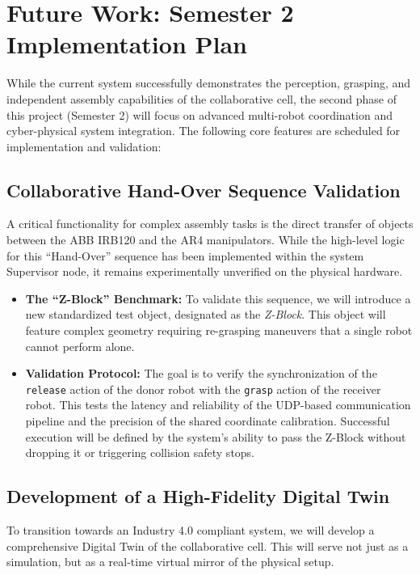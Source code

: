 \section{Future Work: Semester 2 Implementation Plan}

While the current system successfully demonstrates the perception, grasping, and independent assembly capabilities of the collaborative cell, the second phase of this project (Semester 2) will focus on advanced multi-robot coordination and cyber-physical system integration. The following core features are scheduled for implementation and validation:

\subsection{Collaborative Hand-Over Sequence Validation}
A critical functionality for complex assembly tasks is the direct transfer of objects between the ABB IRB120 and the AR4 manipulators. While the high-level logic for this ``Hand-Over'' sequence has been implemented within the system Supervisor node, it remains experimentally unverified on the physical hardware.

\begin{itemize}
    \item \textbf{The ``Z-Block'' Benchmark:} To validate this sequence, we will introduce a new standardized test object, designated as the \textit{Z-Block}. This object will feature complex geometry requiring re-grasping maneuvers that a single robot cannot perform alone.
    
    \item \textbf{Validation Protocol:} The goal is to verify the synchronization of the \texttt{release} action of the donor robot with the \texttt{grasp} action of the receiver robot. This tests the latency and reliability of the UDP-based communication pipeline and the precision of the shared coordinate calibration. Successful execution will be defined by the system's ability to pass the Z-Block without dropping it or triggering collision safety stops.
\end{itemize}

\subsection{Development of a High-Fidelity Digital Twin}
To transition towards an Industry 4.0 compliant system, we will develop a comprehensive Digital Twin of the collaborative cell. This will serve not just as a simulation, but as a real-time virtual mirror of the physical setup.


